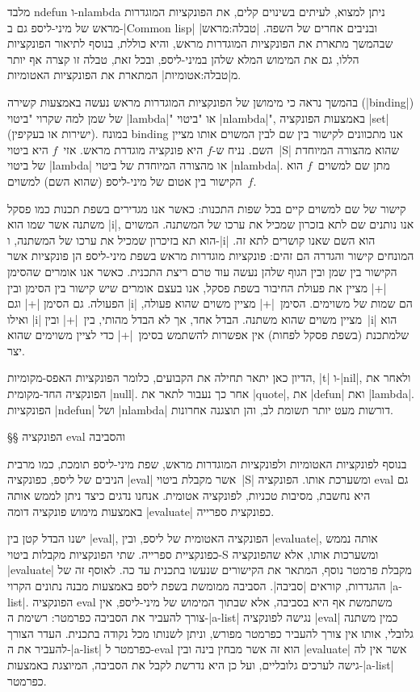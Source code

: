 מלבד ndefun ו-nlambda ניתן למצוא, לעיתים בשינוים קלים, את הפונקציות המוגדרות
מראש של מיני-ליספ גם ב-\E|Common lisp| ובניבים אחרים של השפה.
|טבלה:מראש| שבהמשך מתארת את הפונקציות המוגדרות מראש, והיא כוללת, בנוסף
לתיאור הפונקציות הללו, גם את המימוש המלא שלהן במיני-ליספ, ובכל זאת, טבלה זו
קצרה אף יותר מ|טבלה:אטומיות| המתארת את הפונקציות האטומיות.

בהמשך נראה כי מימושן של הפונקציות המוגדרות מראש נעשה באמצעות קשירה
(\E|binding|) של שמן למה שקרוי "ביטוי \E|lambda|" או "ביטוי \E|nlambda|",
באמצעות הפונקציה \E|set| (ישירות או בעקיפין). במונח binding אנו מתכוונים לקישור
בין שם לבין המשוים אותו מציין השם. נניח ש-$f$ היא פונקציה מוגדרת מראש. אזי~$f$
היא ביטוי~\E|S| שהוא מהצורה המיוחדת של ביטוי \E|lambda| או מהצורה המיוחדת של
ביטוי \E|nlambda|. מתן שם למשוים~$f$ הוא הקישור בין אטום של מיני-ליספ (שהוא
השם) למשוים~$f$.

קישור של שם למשוים קיים בכל שפות התכנות: כאשר אנו מגדירים בשפת תכנות כמו פסקל
משתנה אשר שמו הוא \T|i|, אנו נותנים שם לתא בזכרון שמכיל את ערכו של המשתנה.
המשוים הוא תא בזיכרון שמכיל את ערכו של המשתנה, ו-\T|i| הוא השם שאנו קושרים לתא
זה. המונחים קישור והגדרה הם זהים: פונקציות מוגדרות מראש בשפת מיני-ליספ הן
פונקציות אשר הקישור בין שמן ובין הגוף שלהן נעשה עוד טרם ריצת התכנית. כאשר אנו
אומרים שהסימן \T|+| מציין את פעולת החיבור בשפת פסקל, אנו בעצם אומרים שיש קישור
בין הסימן ובין הפעולה. גם הסימן \T|+| וגם \T|i| הם שמות של משוימים. הסימן~\T|+|
מציין משוים שהוא פעולה, ואילו \T|i| מציין משוים שהוא משתנה. הבדל אחד, אך לא
הבדל מהותי, בין~\T|+| ובין~\T|i| הוא שלמתכנת (בשפת פסקל לפחות) אין אפשרות
להשתמש בסימן~\T|+| כדי לציין משוימים שהוא יצר.

הדיון כאן יתאר תחילה את הקבועים, כלומר הפונקציות האפס-מקומיות, \E|t| ו-\E|nil|,
ולאחר את הפונקציה החד-מקומית \E|null|. אחר כך נעבור לתאר את \E|quote|, את
\E|defun| ואת \E|lambda|. הפונקציות \E|ndefun| ושל \E|nlambda| דורשות מעט יותר
תשומת לב, והן תוצגנה אחרונות.

§§ הפונקציה eval והסביבה

בנוסף לפונקציות האטומיות ולפונקציות המוגדרות מראש, שפת מיני-ליספ תומכת, כמו
מרבית הניבים של ליספ, כפונקציה \E|eval| אשר מקבלת ביטוי~\E|S| ומשערכת אותו.
הפונקציה eval גם היא נחשבת, מסיבות טכניות, לפונקציה אטומית. אנחנו נדגים כיצד
ניתן לממש אותה באמצעות מימוש פונקציה דומה \E|evaluate| כפונקצית ספרייה.

ישנו הבדל קטן בין \E|eval|, הפונקציה האטומית של ליספ, ובין \E|evaluate|, אותה
נממש כפונקציית ספרייה. שתי הפונקציות מקבלות ביטוי-S ומשערכות אותו, אלא
שהפונקציה \E|evaluate| מקבלת פרמטר נוסף, המתאר את הקישורים שנעשו בתכנית עד כה.
לאוסף זה של ההגדרות, קוראים \ע|סביבה|. הסביבה ממומשת בשפת ליספ באמצעות
מבנה נתונים הקרוי \E|a-list|. הפונקציה eval משתמשת אף היא בסביבה, אלא שבתוך
המימוש של מיני-ליספ, אין צורך להעביר את הסביבה כפרמטר: רשימת ה-\E|a-list| נגישה
לפונקציה \E|eval| כמין משתנה גלובלי, אותו אין צורך להעביר כפרמטר מפורש, וניתן
לשנותו מכל נקודה בתכנית. העדר הצורך להעביר את ה-\E|a-list| כפרמטר ל-eval הוא זה
אשר מבחין בינה ובין \E|evaluate| אשר אין לה גישה לערכים גלובליים, ועל כן היא
נדרשת לקבל את הסביבה, המיוצגת באמצעות-\E|a-list| כפרמטר.

